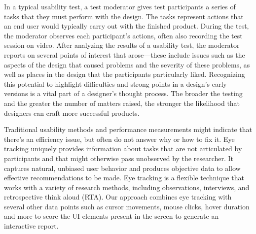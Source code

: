 \documentclass[12pt,a4paper,final]{extreport}
\begin{document}
In a typical usability test, a test moderator gives test participants a series of tasks that they must perform with the design. The tasks represent actions that an end user would typically carry out with the finished product. During the test, the moderator observes each participant’s actions, often also recording the test session on video. After analyzing the results of a usability test, the moderator reports on several points of interest that arose—these include issues such as the aspects of the design that caused problems and the severity of these problems, as well as places in the design that the participants particularly liked. Recognizing this potential to highlight difficulties and strong points in a design’s early versions is a vital part of a designer’s thought process. The broader the testing and the greater the number of matters raised, the stronger the likelihood that designers can craft more successful products. 

Traditional usability methods and performance measurements might indicate that there’s an efficiency issue, but often do not answer why or how to fix it. Eye tracking uniquely provides information about tasks that are not articulated by participants and that might otherwise pass unobserved by the researcher. It captures natural, unbiased user behavior and produces objective data to allow effective recommendations to be made. Eye tracking is a flexible technique that
works with a variety of research methods, including observations, interviews, and retrospective think aloud (RTA). Our approach combines eye tracking with several other data points such as cursor movements, mouse clicks, hover duration and more to score the UI elements present in the screen to generate an interactive report.


\vspace{0.5cm}
\newpage
\end{document}
